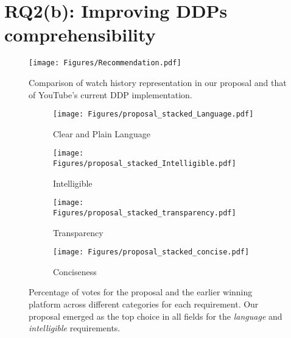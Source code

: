 \section{RQ2(b): Improving DDPs comprehensibility}
\label{Sec: Recommendation}

\begin{figure}
    \centering
    \texttt{[image: Figures/Recommendation.pdf]}
    \caption{ Comparison of watch history representation in our proposal and that of YouTube's current DDP implementation.
    }
    \label{fig:recommendation_representation}
\end{figure}


\begin{figure}[t] %
    \centering
     \begin{subfigure}[t]{0.49\columnwidth}
        \centering
        \texttt{[image: Figures/proposal\_stacked\_Language.pdf]}
        \caption{Clear and Plain Language}
        \label{fig:language_first_preference_our_prop}
    \end{subfigure}
    \begin{subfigure}[t]{0.49\columnwidth}
        \centering
        \texttt{[image: Figures/proposal\_stacked\_Intelligible.pdf]}
        \caption{Intelligible}
        \label{fig:intelligible_first_preference_our_prop}
    \end{subfigure}
    \hfill
    \begin{subfigure}[t]{0.49\columnwidth}
        \centering
        \texttt{[image: Figures/proposal\_stacked\_transparency.pdf]}
        \caption{Transparency}
        \label{fig:tranparency_first_preference_our_prop}
    \end{subfigure}
    \hfill
    \begin{subfigure}[t]{0.49\columnwidth}
        \centering
        \texttt{[image: Figures/proposal\_stacked\_concise.pdf]}
        \caption{Conciseness}
        \label{fig:concise_first_preference_our_prop}
    \end{subfigure}
    
    \caption{ Percentage of votes for the proposal and the earlier winning platform across different categories for each requirement. Our proposal emerged as the top choice in all fields for the \textit{language} and \textit{intelligible} requirements.}
    \label{Fig: RecoEval}
\end{figure}


